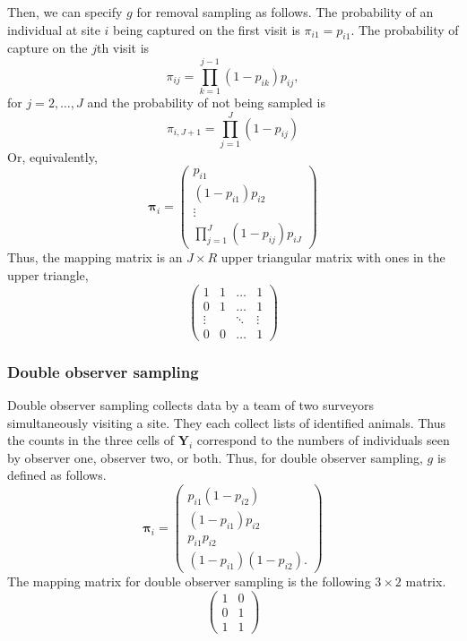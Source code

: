\documentclass[article,shortnames]{jss}
\begin{document}
Then, we can specify $g$ for removal sampling as follows.  The
probability of an individual at site $i$ being captured on the first
visit is $\pi_{i1} = p_{i1}$.  The probability of capture on the $j$th
visit is
\begin{equation}
  \pi_{ij} = \prod_{k=1}^{j-1}(1 - p_{ik})p_{ij},
\end{equation}
for $j=2,\dots,J$ and the probability of not being sampled is
\begin{equation}
  \pi_{i,J+1} = \prod_{j=1}^{J}(1-p_{ij})
\end{equation}
Or, equivalently,
\begin{equation}
  \mathbf \pi_i =
  \begin{pmatrix}
    p_{i1} \\
    (1-p_{i1})p_{i2} \\
    \vdots \\
    \prod_{j=1}^J(1-p_{ij})p_{iJ}
  \end{pmatrix}
\end{equation}
Thus, the mapping matrix is an $J \times R$ upper triangular matrix with ones in
the upper triangle,
\begin{equation}
  \begin{pmatrix}
    1 & 1 & \dots & 1 \\
    0 & 1 & \dots & 1 \\
    \vdots & & \ddots & \vdots \\
    0 & 0 & \dots  & 1
  \end{pmatrix}
\end{equation}


\subsubsection{Double observer sampling}
\label{sec:double-observ-sampl}

Double observer sampling collects data by a team of two surveyors
simultaneously visiting a site.  They each collect lists of identified
animals.  Thus the counts in the three cells of $\mathbf Y_i$
correspond to the numbers of individuals seen by observer one,
observer two, or both.  Thus, for double observer sampling, $g$ is
defined as follows.
\begin{equation}
  \mathbf \pi_i =
  \begin{pmatrix}
    p_{i1}(1-p_{i2}) \\
    (1-p_{i1})p_{i2} \\
    p_{i1}p_{i2} \\
    (1-p_{i1})(1-p_{i2}).
  \end{pmatrix}
\end{equation}
The  mapping matrix for double observer sampling is the
following $3 \times 2$ matrix.
\begin{equation}
  \begin{pmatrix}
    1 & 0 \\
    0 & 1 \\
    1 & 1 
  \end{pmatrix}
\end{equation}
\end{document}
